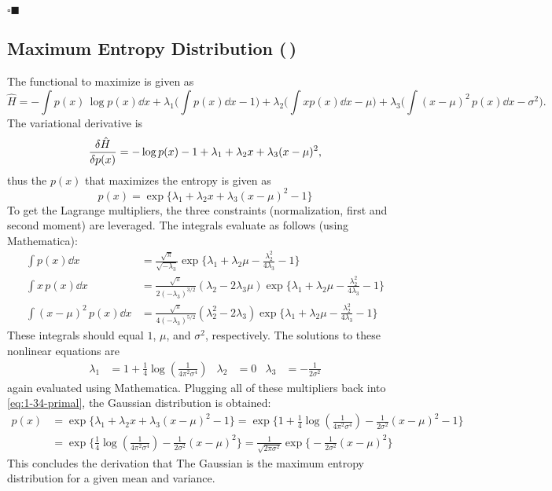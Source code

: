 \documentclass[11pt, a4paper]{scrartcl}
\newcommand{\qedeot}{\hfill\(\square\blacksquare\)}
\newcommand{\diffstar}{\texorpdfstring{\raisebox{-1pt}{\resizebox{!}{8pt}{\(\star\)}}}{*}}
\newcommand{\twostar}  {(\diffstar\,\diffstar)}
\begin{document}
			\qedeot

		\subsection{Maximum Entropy Distribution  \twostar}
			The functional to maximize is given as
			\begin{equation}
				\hat{H} =
					-\!\int\! p(x) \, \log p(x) \dd{x}
						+ \lambda_1 \bigg( \int\! p(x) \dd{x} - 1 \bigg)
						+ \lambda_2 \bigg( \int\! x p(x) \dd{x} - \mu \bigg)
						+ \lambda_3 \bigg( \int\! (x - \mu)^2 \, p(x) \dd{x} - \sigma^2 \bigg).
			\end{equation}
			The variational derivative is
			\begin{equation}
				\fdv{\hat{H}}{p(x)} = -\log p(x) - 1 + \lambda_1 + \lambda_2 x + \lambda_3 (x - \mu)^2,
			\end{equation}
			thus the \(p(x)\) that maximizes the entropy is given as
			\begin{equation}
				p(x) = \exp\Big\{ \lambda_1 + \lambda_2 x + \lambda_3 (x - \mu)^2 - 1 \Big\}  \label{eq:1-34-primal}
			\end{equation}
			To get the Lagrange multipliers, the three constraints (normalization, first and second moment) are leveraged. The integrals evaluate as follows (using Mathematica):
			\begin{align}
				\int\! p(x) \dd{x}
					&= \frac{\sqrt{\pi}}{\sqrt{-\lambda_3}} \exp\Bigg\{ \lambda_1 + \lambda_2 \mu -\frac{\lambda_2^2}{4 \lambda_3} - 1 \Bigg\} \\
				\int\! x \, p(x) \dd{x}
					&= \frac{\sqrt{\pi}}{2 (-\lambda_3)^{3/2}} (\lambda_2 - 2 \lambda_3 \mu) \exp\Bigg\{ \lambda_1 + \lambda_2 \mu - \frac{\lambda_2^2}{4 \lambda_3} - 1 \Bigg\} \\
				\int\! (x - \mu)^2 \, p(x) \dd{x}
					&= \frac{\sqrt{\pi}}{4 (-\lambda_3)^{5/2}} \left(\lambda _2^2-2 \lambda _3\right) \exp\Bigg\{ \lambda_1 + \lambda_2 \mu -\frac{\lambda_2^2}{4 \lambda_3} - 1 \Bigg\}
			\end{align}
			These integrals should equal \(1\), \(\mu\), and \(\sigma^2\), respectively. The solutions to these nonlinear equations are
			\begin{align}
				\lambda_1 &= 1 + \frac{1}{4} \log(\! \frac{1}{4 \pi^2 \sigma^4} \!) &
				\lambda_2 &= 0 &
				\lambda_3 &= -\frac{1}{2 \sigma^2}
			\end{align}
			again evaluated using Mathematica. Plugging all of these multipliers back into \eqref{eq:1-34-primal}, the Gaussian distribution is obtained:
			\begin{align}
				p(x)
					&= \exp\Big\{ \lambda_1 + \lambda_2 x + \lambda_3 (x - \mu)^2 - 1 \Big\}
					 = \exp\bigg\{ 1 + \frac{1}{4} \log(\! \frac{1}{4 \pi^2 \sigma^4} \!) - \frac{1}{2 \sigma^2} (x - \mu)^2 - 1 \bigg\} \\
					&= \exp\bigg\{ \frac{1}{4} \log(\! \frac{1}{4 \pi^2 \sigma^4} \!) - \frac{1}{2 \sigma^2} (x - \mu)^2 \bigg\}
					 = \frac{1}{\sqrt{2 \pi \sigma^2}} \exp\bigg\{\! -\frac{1}{2 \sigma^2} (x - \mu)^2 \bigg\}
			\end{align}
			This concludes the derivation that The Gaussian is the maximum entropy distribution for a given mean and variance.
\end{document}
